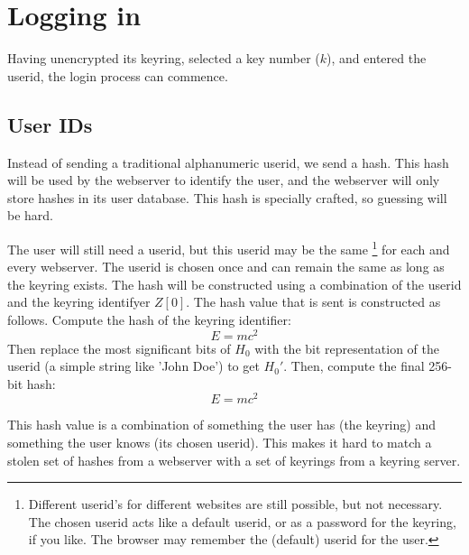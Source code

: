 %
%
%
\section{Logging in}
\label{logging_in}
Having unencrypted its keyring, selected a key number ($k$), and entered the userid, the login process can commence.

\subsection{User IDs}
\label{sec:user_ids}
Instead of sending a traditional alphanumeric userid,
we send a hash.
This hash will be used by the webserver to identify the user,
and the webserver will only store hashes in its user database.
This hash is specially crafted,
so guessing will be hard.
\par
The user will still need a userid,
but this userid may be the same%
\footnote{Different userid's for different websites are still possible, but not necessary.
The chosen userid acts like a default userid, or as a password for the keyring, if you like.
The browser may remember the (default) userid for the user.}
for each and every webserver.
The userid is chosen once and can remain the same as long as the keyring exists.
The hash will be constructed using a combination of the userid and the keyring identifyer $Z[0]$.
The hash value that is sent is constructed as follows.
Compute the hash of the keyring identifier:
\[E=mc^2\]
Then replace the most significant bits of $H_0$ with the bit representation of the userid
(a simple string like 'John Doe')
to get $H_0'$.
Then, compute the final 256-bit hash:
\[E=mc^2\]
\par
This hash value is a combination of something the user has
(the keyring)
and something the user knows
(its chosen userid).
This makes it hard to match a stolen set of hashes from a webserver with a set of keyrings from a keyring server.

